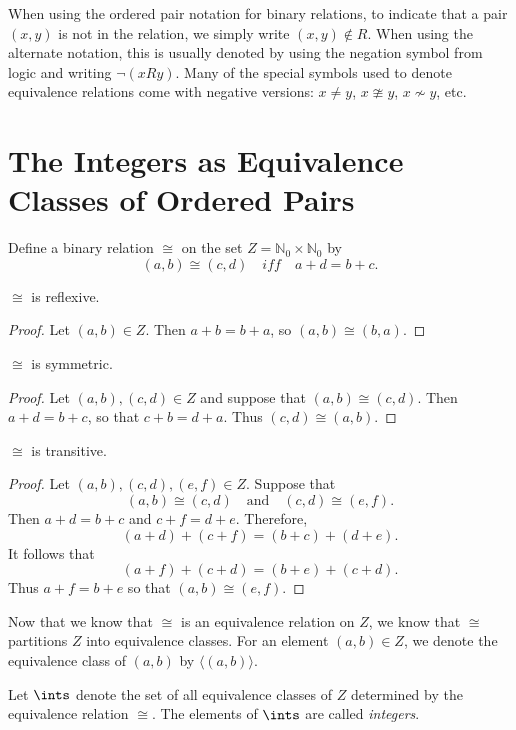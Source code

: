 When using the ordered pair notation for binary relations,
to indicate that a pair $(x,y)$ is not in the relation,
we simply write $(x,y)\notin R$. When using the alternate
notation, this is usually denoted by using the negation
symbol from logic and writing $\lnot (xRy)$.  Many of the
special symbols used to denote equivalence relations
come with negative versions: $x\neq y$, $x\ncong y$,
$x\nsim y$, etc.

\section{The Integers as Equivalence Classes of Ordered Pairs}\label{s:integers}

Define a binary relation $\cong$ on the set $Z=\mathbb{N}_0
 \times\mathbb{N}_0$ by
\[
(a,b)\cong (c,d)\quad\textit{iff}\quad a+d=b+c.
\]

\begin{lemma}
$\cong$ is reflexive.
\end{lemma}

\begin{proof}
Let $(a,b)\in Z$.  Then $a+b=b+a$, so $(a,b)\cong(b,a)$.
\end{proof}

\begin{lemma}
$\cong$ is symmetric.
\end{lemma}

\begin{proof} Let $(a,b),(c,d)\in Z$ and suppose
that $(a,b)\cong (c,d)$.  Then $a+d=b+c$, so that
$c+b=d+a$.  Thus $(c,d)\cong (a,b)$.
\end{proof}

\begin{lemma}
$\cong$ is transitive.
\end{lemma}

\begin{proof}
Let $(a,b), (c,d), (e,f)\in Z$.  Suppose that
\[
(a,b)\cong(c,d)\quad\text{and}\quad (c,d)\cong (e,f).
\]
Then $a+d=b+c$ and $c+f=d+e$.  Therefore,
\[
(a+d)+(c+f) =(b+c)+(d+e).
\]
It follows that
\[
(a+f)+(c+d) =(b+e)+(c+d).
\]
Thus $a+f = b+e$ so that $(a,b)\cong(e,f)$.
\end{proof}

Now that we know that $\cong$ is an equivalence relation on
$Z$, we know that $\cong$ partitions $Z$ into equivalence classes.
For an element $(a,b)\in Z$, we denote the equivalence class
of $(a,b)$ by $\langle (a,b)\rangle$.

Let $\ints$ denote the set of all equivalence classes of $Z$
determined by the equivalence relation $\cong$.  The elements
of $\ints$ are called \textit{integers}.

